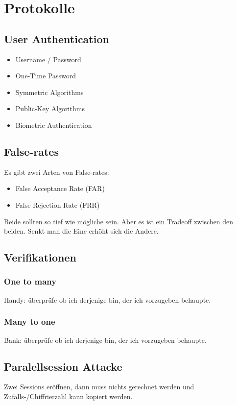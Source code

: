 \documentclass[12pt]{scrartcl}
\begin{document}
\newpage
\section{Protokolle}


\subsection{User Authentication}

\begin{itemize}
    \item Username / Password
    \item One-Time Password
    \item Symmetric Algorithms
    \item Public-Key Algorithms
    \item Biometric Authentication
\end{itemize}

\vspace{0.5cm}
\subsection{False-rates}
Es gibt zwei Arten von False-rates:
\begin{itemize}
    \item False Acceptance Rate (FAR)
    \item False Rejection Rate (FRR)
\end{itemize}

Beide sollten so tief wie mögliche sein. Aber es ist ein Tradeoff zwischen den beiden.
Senkt man die Eine erhöht sich die Andere.


\subsection{Verifikationen}
\subsubsection{One to many}
Handy: überprüfe ob ich derjenige bin, der ich vorzugeben behaupte.


\subsubsection{Many to one}
Bank: überprüfe ob ich derjenige bin, der ich vorzugeben behaupte.


\subsection{Paralellsession Attacke}
Zwei Sessions eröffnen, dann muss nichts gerechnet werden und Zufalls-/Chiffrierzahl
kann kopiert werden.
\end{document}

